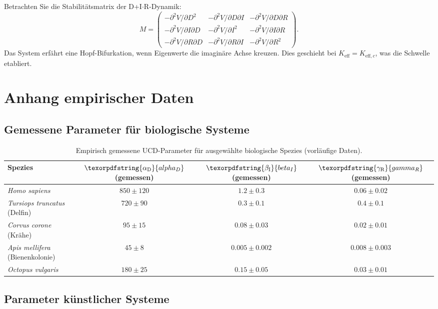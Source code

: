 \documentclass[12pt,a4paper]{article}
\DeclareRobustCommand{\alD}{\texorpdfstring{\ensuremath{\alpha_{\mathrm{D}}}}{alpha_D}}
\DeclareRobustCommand{\beI}{\texorpdfstring{\ensuremath{\beta_{\mathrm{I}}}}{beta_I}}
\DeclareRobustCommand{\gaR}{\texorpdfstring{\ensuremath{\gamma_{\mathrm{R}}}}{gamma_R}}
\newcommand{\eff}{\mathrm{eff}}
\newcommand{\Ke}{K_{\eff}}
\newcommand{\Kec}{K_{\eff,c}}
\begin{document}
	Betrachten Sie die Stabilitätsmatrix der D+I\(\cdot\)R-Dynamik:
	\[
	M = \begin{pmatrix}
		-\partial^2 V/\partial D^2 & -\partial^2 V/\partial D\partial I & -\partial^2 V/\partial D\partial R \\
		-\partial^2 V/\partial I\partial D & -\partial^2 V/\partial I^2 & -\partial^2 V/\partial I\partial R \\
		-\partial^2 V/\partial R\partial D & -\partial^2 V/\partial R\partial I & -\partial^2 V/\partial R^2
	\end{pmatrix}.
	\]
	Das System erfährt eine Hopf-Bifurkation, wenn Eigenwerte die imaginäre Achse kreuzen. Dies geschieht bei \(\Ke = \Kec\), was die Schwelle etabliert.
	
	\section{Anhang empirischer Daten}
	
	\subsection{Gemessene Parameter für biologische Systeme}
	
	\begin{table}[ht]
		\centering
		\begin{tabular}{lccc}
			\toprule
			\textbf{Spezies} & \(\alD\) (gemessen) & \(\beI\) (gemessen) & \(\gaR\) (gemessen) \\
			\midrule
			\textit{Homo sapiens} & \(850 \pm 120\) & \(1.2 \pm 0.3\) & \(0.06 \pm 0.02\) \\
			\textit{Tursiops truncatus} (Delfin) & \(720 \pm 90\) & \(0.3 \pm 0.1\) & \(0.4 \pm 0.1\) \\
			\textit{Corvus corone} (Krähe) & \(95 \pm 15\) & \(0.08 \pm 0.03\) & \(0.02 \pm 0.01\) \\
			\textit{Apis mellifera} (Bienenkolonie) & \(45 \pm 8\) & \(0.005 \pm 0.002\) & \(0.008 \pm 0.003\) \\
			\textit{Octopus vulgaris} & \(180 \pm 25\) & \(0.15 \pm 0.05\) & \(0.03 \pm 0.01\) \\
			\bottomrule
		\end{tabular}
		\caption{Empirisch gemessene UCD-Parameter für ausgewählte biologische Spezies (vorläufige Daten).}
		\label{tab:bio-measurements}
	\end{table}
	
	\subsection{Parameter künstlicher Systeme}
	
\end{document}
